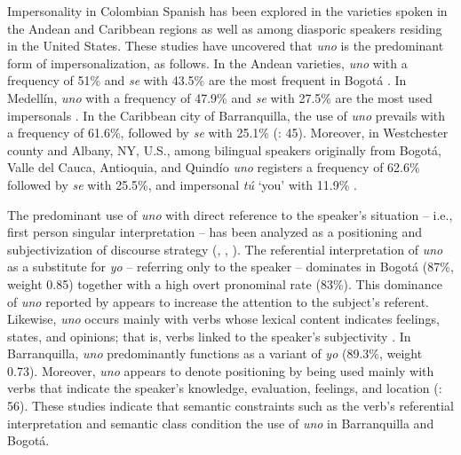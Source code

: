 \documentclass[output=paper]{langscibook}
\begin{document}
Impersonality in Colombian Spanish has been explored in the varieties spoken in the Andean and Caribbean regions as well as among diasporic speakers residing in the United States. These studies have uncovered that \textit{uno} is the predominant form of impersonalization, as follows. In the Andean varieties, \textit{uno} with a frequency of 51\% and \textit{se} with 43.5\% are the most frequent in Bogotá \citep[184]{Hurtado2016}. In Medellín, \textit{uno} with a frequency of 47.9\% and \textit{se} with 27.5\% are the most used impersonals \citep[160]{Dieck2016}. In the Caribbean city of Barranquilla, the use of \textit{uno} prevails with a frequency of 61.6\%, followed by \textit{se} with 25.1\% (\citealt{HurtadoGutiérrez-Rivas2016}: 45). Moreover, in Westchester county and Albany, NY, U.S., among bilingual speakers originally from Bogotá, Valle del Cauca, Antioquia, and Quindío \textit{uno} registers a frequency of 62.6\% followed by \textit{se} with 25.5\%, and impersonal \textit{tú} ‘you’ with 11.9\% \citep[152]{Ramírez2007}.    



The predominant use of \textit{uno} with direct reference to the speaker’s situation – i.e., first person singular interpretation – has been analyzed as a positioning and subjectivization of discourse strategy (\citealt{Hurtado2015}, \citealt{HurtadoGutiérrez-Rivas2016}, \citealt{Ramírez2007}). The referential interpretation of \textit{uno} as a substitute for \textit{yo} – referring only to the speaker – dominates in Bogotá (87\%, weight 0.85) together with a high overt pronominal rate (83\%). This dominance of \textit{uno} reported by \citet{Hurtado2015} appears to increase the attention to the subject’s referent. Likewise, \textit{uno} occurs mainly with verbs whose lexical content indicates feelings, states, and opinions; that is, verbs linked to the speaker’s subjectivity \citep[136-137]{Hurtado2015}. In Barranquilla, \textit{uno} predominantly functions as a variant of \textit{yo} (89.3\%, weight 0.73). Moreover, \textit{uno} appears to denote positioning by being used mainly with verbs that indicate the speaker’s knowledge, evaluation, feelings, and location (\citealt{HurtadoGutiérrez-Rivas2016}: 56). These studies indicate that semantic constraints such as the verb’s referential interpretation and semantic class condition the use of \textit{uno} in Barranquilla and Bogotá.  
\end{document}
